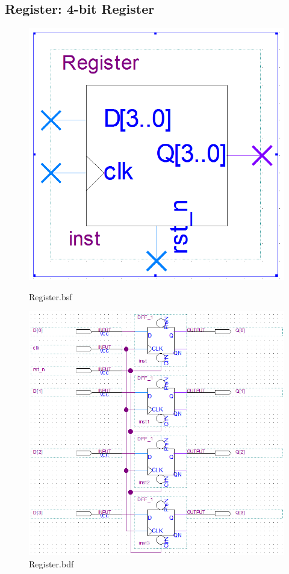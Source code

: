\documentclass[12pt,a4paper]{article}
\begin{document}
  \subsection{Register: 4-bit Register}
  \begin{figure}[H]
    \centering
    \begin{subcaptionblock}{0.19\linewidth}
      \includegraphics[width=\linewidth]{Lab2_2/Register_bsf.png}
      \caption{Register.bsf}
    \end{subcaptionblock}
    \begin{subcaptionblock}{0.8\linewidth}
      \includegraphics[width=\linewidth]{Lab2_2/Register_bdf.png}
      \caption{Register.bdf}
    \end{subcaptionblock}
  \end{figure}
\end{document}
